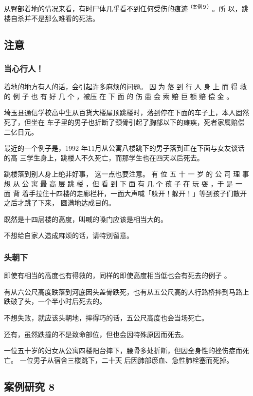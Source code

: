 \documentclass[UTF8]{ctexart}
\begin{document}
从臀部着地的情况来看，有时尸体几乎看不到任何受伤的痕迹$^{（案例９）}$。所 以，跳楼自杀并不是那么难看的死法。

\subsection{注意}

\subsubsection*{当心行人！}

着地的地方有人的话，会引起许多麻烦的问题。 因 为 落 到 行 人 身 上 而 得 救 的 例 子 也 有 好 几 个 ，被压 在 下 面 的 伤 患 会 索 赔 巨 额 赔 偿 金 。

埼玉县通信学校高中生从百货大楼屋顶跳楼时，落到停在下面的车子上，本人固然死了，但坐在 车子里的男子也折断了颈骨引起了胸部以下的瘫痪，死者家属赔偿二亿日元。

最近的一个例子是，1992 年11月从公寓八楼跳下的男子落到正在下面与女友谈话的高 三学生身上，跳楼人不久死亡，而那学生也在四天以后死去。

跳楼落到别人身上绝非好事， 这一点也要注意。 有 位 五 十 一 岁 的 公 司 理 事 想 从 公 寓 最 高 层 跳 楼 ，但 看 到 下 面 有 几 个 孩 子 在 玩 耍 ，于 是 一 面 背 着手拉住十四楼的走廊栏杆，一面大声喊「躲开！躲开！」等到孩子们散开之后才跳了下来， 圆满地达成目的。

既然是十四层楼的高度，叫喊的嗓门应该是相当大的。

不想给自家人造成麻烦的话，请特别留意。 

\subsubsection*{头朝下}

即使有相当的高度也有得救的，同样的即使高度相当低也会有死去的例子 。

有从六公尺高度跌落到河底因头盖骨跌死，也有从五公尺高的人行路桥摔到马路上跌破了头，一个半小时后死去的。

不想失败，就应该头朝地，摔得巧的话，五公尺高度也会当场死亡。

还有，虽然跌撞的不是致命部位，但也会因特殊原因而死去。

一位五十岁的妇女从公寓四楼阳台摔下，腰骨多处折断，但因全身性的挫伤症而死亡。
一位男子从宿舍三楼跳下，二十天 后因肺部瘀血、急性肺栓塞而死掉。

\subsection{案例研究 8}
\end{document}
